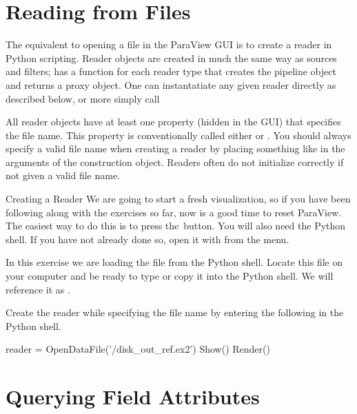 \section{Reading from Files}
\label{sec:ReadingFromFiles}

The equivalent to opening a file in the ParaView GUI is to create a reader
in Python scripting.  Reader objects are created in much the same way as
sources and filters;  has a function for each
reader type that creates the pipeline object and returns a proxy
object. One can instantatiate any given reader directly as described
below, or more simply call 

All reader objects have at least one property (hidden in the GUI) that
specifies the file name.  This property is conventionally called either
 or .  You should always specify a valid
file name when creating a reader by placing something like
 in the arguments of the construction
object.  Readers often do not initialize correctly if not given a valid
file name.

\begin{exercise}{Creating a Reader}
  \label{ex:CreatingAReader}%
  We are going to start a fresh visualization, so if you have been
  following along with the exercises so far, now is a good time to reset
  ParaView.  The easiest way to do this is to press the~\disconnect button.
  You will also need the Python shell.  If you have not already done so,
  open it with  \ra {} from the menu.

  In this exercise we are loading the  file from
  the Python shell.  Locate this file on your computer and be ready to type
  or copy it into the Python shell.  We will reference it as
  .

  Create the reader while specifying the file name by entering the following
  in the Python shell.

  \begin{pythonpluscommands}
reader = OpenDataFile('/disk_out_ref.ex2')
Show()
Render()
  \end{pythonpluscommands}
\end{exercise}


\section{Querying Field Attributes}
\label{sec:QueryingFieldAttributes}

